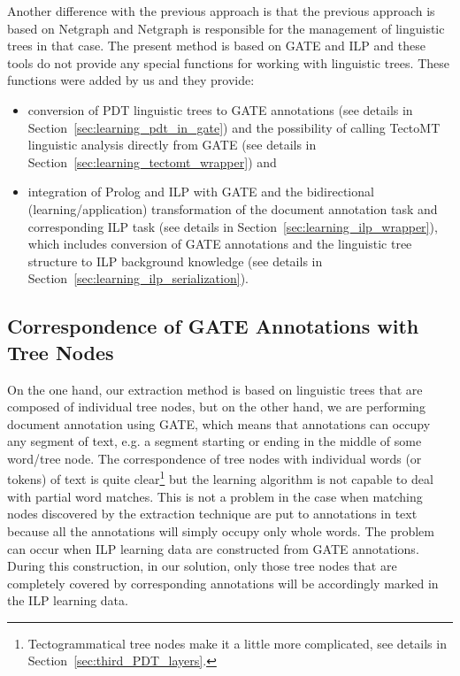 Another difference with the previous approach is that the previous approach is based on Netgraph and Netgraph is responsible for the management of linguistic trees in that case. The present method is based on GATE and ILP and these tools do not provide any special functions for working with linguistic trees. These functions were added by us and they provide:
\begin{itemize}	
	\item conversion of PDT linguistic trees to GATE annotations (see details in Section~\ref{sec:learning_pdt_in_gate}) and the possibility of calling TectoMT linguistic analysis directly from GATE (see details in Section~\ref{sec:learning_tectomt_wrapper}) and
	
	\item integration of Prolog and ILP with GATE and the bidirectional (learning/application) transformation of the document annotation task and corresponding ILP task (see details in Section~\ref{sec:learning_ilp_wrapper}), which includes conversion of GATE annotations and the linguistic tree structure to ILP background knowledge (see details in Section~\ref{sec:learning_ilp_serialization}).
\end{itemize}





\subsection{Correspondence of GATE Annotations with Tree Nodes}

On the one hand, our extraction method is based on linguistic trees that are composed of individual tree nodes, but on the other hand, we are performing document annotation using GATE, which means that annotations can occupy any segment of text, e.g. a segment starting or ending in the middle of some word/tree node. The correspondence of tree nodes with individual words (or tokens) of text is quite clear\footnote{Tectogrammatical tree nodes make it a little more complicated, see details in Section~\ref{sec:third_PDT_layers}.} but the learning algorithm is not capable to deal with partial word matches. This is not a problem in the case when matching nodes discovered by the extraction technique are put to annotations in text because all the annotations will simply occupy only whole words. The problem can occur when ILP learning data are constructed from GATE annotations. During this construction, in our solution, only those tree nodes that are completely covered by corresponding annotations will be accordingly marked in the ILP learning data.


